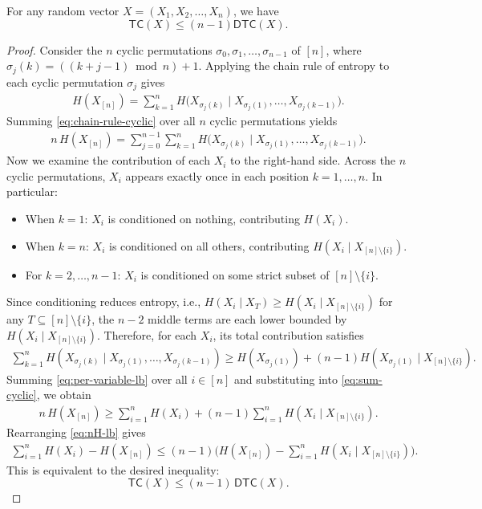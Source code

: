 \documentclass[10pt,a4paper]{amsart}
\newcommand{\DTC}{\mathsf{DTC}}
\newcommand{\TC}{\mathsf{TC}}
\begin{document}
\begin{lemma}
\label{lem:dtc-tc-relation}
For any random vector $X = (X_1, X_2, \ldots, X_n)$, we have
\[
    \TC(X) \leq (n-1)\DTC(X).
\]
\end{lemma}

\begin{proof}
Consider the $n$ cyclic permutations $\sigma_0, \sigma_1, \ldots, \sigma_{n-1}$ of $[n]$, where $\sigma_j(k) = ((k + j - 1) \bmod n) + 1$. Applying the chain rule of entropy to each cyclic permutation $\sigma_j$ gives
\begin{align}
    H(X_{[n]}) = \sum_{k=1}^n H\big(X_{\sigma_j(k)} \mid X_{\sigma_j(1)}, \ldots, X_{\sigma_j(k-1)}\big). \label{eq:chain-rule-cyclic}
\end{align}
Summing \eqref{eq:chain-rule-cyclic} over all $n$ cyclic permutations yields
\begin{align}
    n \, H(X_{[n]}) = \sum_{j=0}^{n-1} \sum_{k=1}^n H\big(X_{\sigma_j(k)} \mid X_{\sigma_j(1)}, \ldots, X_{\sigma_j(k-1)}\big). \label{eq:sum-cyclic}
\end{align}
Now we examine the contribution of each $X_i$ to the right-hand side. Across the $n$ cyclic permutations, $X_i$ appears exactly once in each position $k = 1, \ldots, n$. In particular:
\begin{itemize}
    \item When $k = 1$: $X_i$ is conditioned on nothing, contributing $H(X_i)$.
    \item When $k = n$: $X_i$ is conditioned on all others, contributing $H(X_i \mid X_{[n] \setminus \{i\}})$.
    \item For $k = 2, \ldots, n-1$: $X_i$ is conditioned on some strict subset of $[n] \setminus \{i\}$.
\end{itemize}
Since conditioning reduces entropy, i.e., $H(X_i \mid X_T) \geq H(X_i \mid X_{[n] \setminus \{i\}})$ for any $T \subseteq [n] \setminus \{i\}$, the $n - 2$ middle terms are each lower bounded by $H(X_i \mid X_{[n] \setminus \{i\}})$. Therefore, for each $X_i$, its total contribution satisfies
\begin{align}
    \sum_{k=1}^n H(X_{\sigma_j(k)} \mid X_{\sigma_j(1)}, \ldots, X_{\sigma_j(k-1)}) \geq H(X_{\sigma_j(1)} ) + (n-1) H(X_{\sigma_j(1)}  \mid X_{[n] \setminus \{i\}}). \label{eq:per-variable-lb}
\end{align}
Summing \eqref{eq:per-variable-lb} over all $i \in [n]$ and substituting into \eqref{eq:sum-cyclic}, we obtain
\begin{align}
    n \, H(X_{[n]}) \geq \sum_{i=1}^n H(X_i) + (n-1) \sum_{i=1}^n H(X_i \mid X_{[n] \setminus \{i\}}). \label{eq:nH-lb}
\end{align}
Rearranging \eqref{eq:nH-lb} gives
\begin{align*}
    \sum_{i=1}^n H(X_i) - H(X_{[n]}) \leq (n-1) \bigg(H(X_{[n]}) - \sum_{i=1}^n H(X_i \mid X_{[n] \setminus \{i\}}) \bigg).
\end{align*}
This is equivalent to the desired inequality:
\[
    \TC(X) \leq (n-1)\,\DTC(X).
\]
\end{proof}
\end{document}

